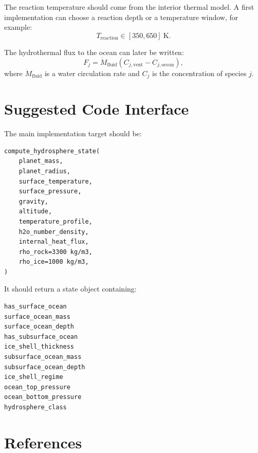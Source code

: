 \documentclass[11pt]{article}
\begin{document}
The reaction temperature should come from the interior thermal model. A first
implementation can choose a reaction depth or a temperature window, for example:
\begin{equation}
    T_{\mathrm{reaction}} \in [350, 650]\ \mathrm{K}.
\end{equation}

The hydrothermal flux to the ocean can later be written:
\begin{equation}
    F_j =
    \dot{M}_{\mathrm{fluid}}
    \left(C_{j,\mathrm{vent}} - C_{j,\mathrm{ocean}}\right),
\end{equation}
where $\dot{M}_{\mathrm{fluid}}$ is a water circulation rate and $C_j$ is the
concentration of species $j$.

\section{Suggested Code Interface}

The main implementation target should be:
\begin{verbatim}
compute_hydrosphere_state(
    planet_mass,
    planet_radius,
    surface_temperature,
    surface_pressure,
    gravity,
    altitude,
    temperature_profile,
    h2o_number_density,
    internal_heat_flux,
    rho_rock=3300 kg/m3,
    rho_ice=1000 kg/m3,
)
\end{verbatim}

It should return a state object containing:
\begin{verbatim}
has_surface_ocean
surface_ocean_mass
surface_ocean_depth
has_subsurface_ocean
ice_shell_thickness
subsurface_ocean_mass
subsurface_ocean_depth
ice_shell_regime
ocean_top_pressure
ocean_bottom_pressure
hydrosphere_class
\end{verbatim}

\section{References}
\end{document}
